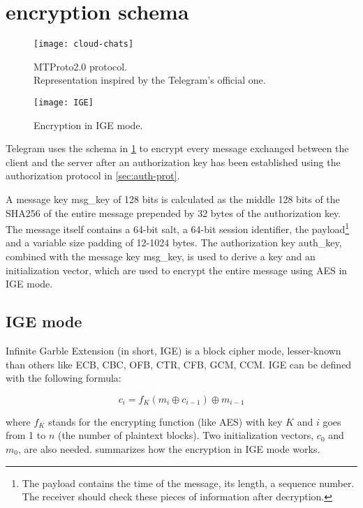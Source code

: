 \section{\Cchat{} encryption schema}
\label{sec:cloud-chat}

\begin{figure}[t]
  \centering
  \texttt{[image: cloud-chats]}
  \caption{MTProto2.0 \cchat{} protocol.\\Representation inspired by the Telegram's official one.}
  \label{fig:cloud-chat-protocol}
\end{figure}
\begin{figure}[t]
  \centering
  \texttt{[image: IGE]}
  \caption{Encryption in IGE mode.}
  \label{fig:IGE}
\end{figure}

Telegram uses the schema in \cref{fig:cloud-chat-protocol} to encrypt every message exchanged between the client and the server after an authorization key has been established using the authorization protocol in \cref{sec:auth-prot}.

A message key msg\_key of 128 bits is calculated as the middle 128 bits of the SHA256 of the entire message prepended by 32 bytes of the authorization key. The message itself contains a 64-bit salt, a 64-bit session identifier, the payload\footnote{The payload contains the time of the message, its length, a sequence number. The receiver should check these pieces of information after decryption.} and a variable size padding of 12-1024 bytes.
The authorization key auth\_key, combined with the message key msg\_key, is used to derive a key and an initialization vector, which are used to encrypt the entire message using AES in IGE mode.

\subsection{IGE mode}
Infinite Garble Extension (in short, IGE) is a block cipher mode, lesser-known than others like ECB, CBC, OFB, CTR, CFB, GCM, CCM.
IGE can be defined with the following formula:

\begin{equation}
  c_i = f_K(m_i \oplus c_{i-1}) \oplus m_{i-1}
\end{equation}

where $f_K$ stands for the encrypting function (like AES) with key $K$
and $i$ goes from 1 to $n$ (the number of plaintext blocks). Two initialization vectors, $c_0$ and $m_0$, are also needed.  summarizes how the encryption in IGE mode works.


